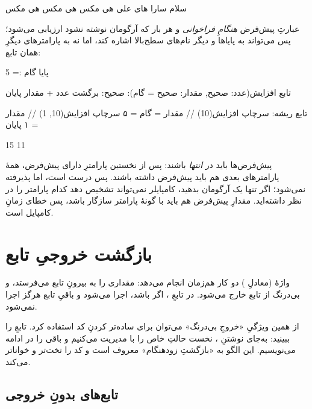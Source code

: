 \begin{progout}
سلام سارا
های علی
هی مکس
هی مکس
هی مکس
\end{progout}

عبارتِ پیش‌فرض \emph{هنگامِ فراخوانی} و هر بار که آرگومان نوشته نشود ارزیابی
می‌شود؛ پس می‌تواند به پایاها و دیگر نام‌های سطح‌بالا اشاره کند، اما نه به
پارامترهای دیگرِ همان تابع:

\begin{salamfa}
پایا گام := 5

تابع افزایش(عدد: صحیح, مقدار: صحیح = گام): صحیح:
    برگشت عدد + مقدار
پایان

تابع ریشه:
    سرچاپ افزایش(10)       // مقدار = گام = ۵
    سرچاپ افزایش(10, 1)    // مقدار = ۱
پایان
\end{salamfa}

\begin{progout}
15
11
\end{progout}

\begin{warn}
پیش‌فرض‌ها باید در \emph{انتها} باشند: پس از نخستین پارامترِ دارای پیش‌فرض، همهٔ
پارامترهای بعدی هم باید پیش‌فرض داشته باشند. پس
 درست است، اما
 پذیرفته نمی‌شود؛ اگر تنها یک آرگومان بدهید،
کامپایلر نمی‌تواند تشخیص دهد کدام پارامتر را در نظر داشته‌اید. مقدارِ پیش‌فرض هم
باید با گونهٔ پارامتر سازگار باشد، پس  خطای زمانِ
کامپایل است.
\end{warn}

\section{بازگشت خروجیِ تابع}

واژهٔ  (معادلِ ) دو کار هم‌زمان انجام می‌دهد: مقداری را
به بیرونِ تابع می‌فرستد، و بی‌درنگ از تابع خارج می‌شود. در تابعِ ،
اگر  باشد،  اجرا می‌شود و باقیِ تابع هرگز
اجرا نمی‌شود.

\begin{tip}
از همین ویژگیِ «خروجِ بی‌درنگ» می‌توان برای ساده‌تر کردنِ کد استفاده کرد.
تابعِ  را ببینید: به‌جای نوشتنِ ، نخست حالتِ
خاص را با  مدیریت می‌کنیم و باقی را در ادامه می‌نویسیم. این الگو
به «بازگشتِ زودهنگام» معروف است و کد را تخت‌تر و خواناتر می‌کند.
\end{tip}

\subsection{تابع‌های بدونِ خروجی}

